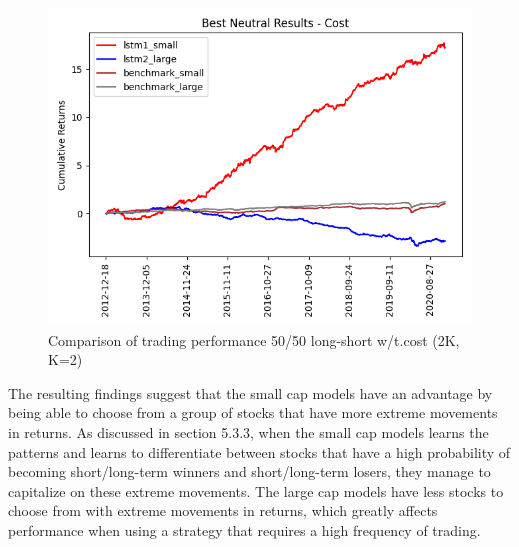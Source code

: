 \indent\newline 
\begin{figure}[H]
\centering
\includegraphics [scale=0.60,angle=360]{figures/cumulative_best_neutral_mix_return_cost.png}
\caption{Comparison of trading performance 50/50 long-short w/t.cost (2K, K=2)}
\label{fig:mix50c}
\end{figure}
\indent\newline 
The resulting findings suggest that the small cap models have an advantage by being able to choose from a group of stocks that have more extreme movements in returns. As discussed in section 5.3.3, when the small cap models learns the patterns and learns to differentiate between stocks that have a high probability of becoming short/long-term winners and short/long-term losers, they manage to capitalize on these extreme movements. The large cap models have less stocks to choose from with extreme movements in returns, which greatly affects performance when using a strategy that requires a high frequency of trading.

